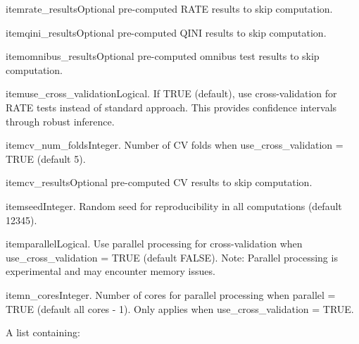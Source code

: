 \documentclass[a4paper]{book}
\begin{document}
\begin{Arguments}
\begin{ldescription}
\bsl{}itemrate\_resultsOptional pre-computed RATE results to skip computation.

\bsl{}itemqini\_resultsOptional pre-computed QINI results to skip computation.

\bsl{}itemomnibus\_resultsOptional pre-computed omnibus test results to skip computation.

\bsl{}itemuse\_cross\_validationLogical. If TRUE (default), use cross-validation for RATE tests
instead of standard approach. This provides confidence intervals through robust inference.

\bsl{}itemcv\_num\_foldsInteger. Number of CV folds when use\_cross\_validation = TRUE (default 5).

\bsl{}itemcv\_resultsOptional pre-computed CV results to skip computation.

\bsl{}itemseedInteger. Random seed for reproducibility in all computations (default 12345).

\bsl{}itemparallelLogical. Use parallel processing for cross-validation when use\_cross\_validation = TRUE 
(default FALSE). Note: Parallel processing is experimental and may encounter memory issues.

\bsl{}itemn\_coresInteger. Number of cores for parallel processing when parallel = TRUE 
(default all cores - 1). Only applies when use\_cross\_validation = TRUE.

\end{ldescription}

A list containing:
\begin{itemize}


\end{itemize}
\end{Arguments}
\end{document}
